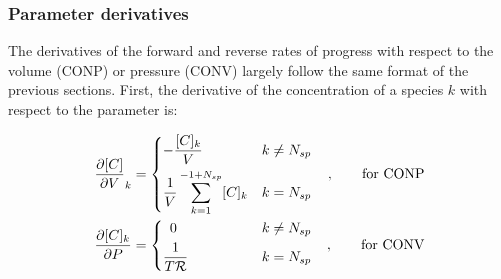 \documentclass[12pt]{article}
\newcommand{\ns}{\ensuremath{{N_{sp}}}}
\newcommand{\conp}{CONP}
\newcommand{\conv}{CONV}
\newcommand{\dconp}{\ensuremath{,\qquad\text{for \conp}}}
\newcommand{\dconv}{\ensuremath{,\qquad\text{for \conv}}}
\newcommand{\Ru}{\ensuremath{\mathcal{R}}}
\begin{document}
\subsubsection{Parameter derivatives}
The derivatives of the forward and reverse rates of progress with respect to the volume (\conp) or pressure (\conv) largely follow the same format of the previous sections.
First, the derivative of the concentration of a species $k$ with respect to the parameter is:

\begin{subequations}
 \begin{align}
 \frac{\partial [C] }{\partial V }_{k} &=
 \begin{dcases}
  \mathrlap{-\frac{[C]_{k}}{V}}\hphantom{\frac{1}{V} \sum_{k=1}^{-1 + \ns} [C]_{k}} & k \ne \ns \\
  \frac{1}{V} \sum_{k=1}^{-1 + \ns} [C]_{k} & k = \ns
 \end{dcases}&\dconp \\
 \frac{\partial [C]_{k} }{\partial P } &=
 \begin{dcases}
  \mathrlap{\hphantom{0}0}\hphantom{\frac{1}{V} \sum_{k=1}^{-1 + \ns} [C]_{k}} & k \ne \ns \\
  \mathrlap{\frac{1}{T \Ru}}\hphantom{\frac{1}{V} \sum_{k=1}^{-1 + \ns} [C]_{k}} & k = \ns
 \end{dcases}&\dconv
 \end{align}
\end{subequations}
\end{document}
